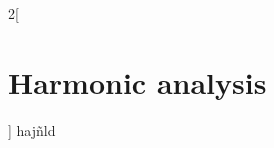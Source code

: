 \documentclass[../../../main_math.tex]{subfiles}
\begin{document}
\renewcommand{\col}{\ana}
\begin{multicols}{2}[\section{Harmonic analysis}]
  hajñld
\end{multicols}
\end{document}
